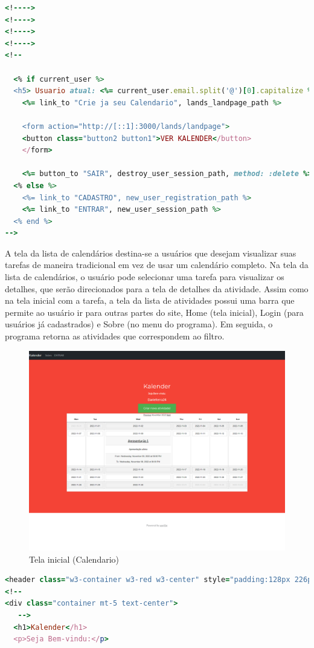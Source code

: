 \begin{itemize}
\begin{lstlisting}[language=Ruby, caption=Tela inicial do sistema (home)]
<!---->
<!---->
<!---->
<!---->
<!--

  <% if current_user %>
  <h5> Usuario atual: <%= current_user.email.split('@')[0].capitalize %> </h5>
    <%= link_to "Crie ja seu Calendario", lands_landpage_path %>

    <form action="http://[::1]:3000/lands/landpage">
    <button class="button2 button1">VER KALENDER</button>
    </form>

    <%= button_to "SAIR", destroy_user_session_path, method: :delete %>
  <% else %>
    <%= link_to "CADASTRO", new_user_registration_path %>
    <%= link_to "ENTRAR", new_user_session_path %>
  <% end %>
-->

        \end{lstlisting}

        A tela da lista de calendários destina-se a usuários que desejam visualizar suas tarefas de maneira tradicional em vez de usar um calendário completo. Na tela da lista de calendários, o usuário pode selecionar uma tarefa para visualizar os detalhes, que serão direcionados para a tela de detalhes da atividade. Assim como na tela inicial com a tarefa, a tela da lista de atividades possui uma barra que permite ao usuário ir para outras partes do site, Home (tela inicial), Login (para usuários já cadastrados) e Sobre (no menu do programa). Em seguida, o programa retorna as atividades que correspondem ao filtro.
        \begin{figure}[H]
          \begin{center}
            \includegraphics[width=12cm]{Pictures/interface/chat1.png}
            \caption{Tela inicial (Calendario)} \label{chat1}
          \end{center}
        \end{figure}
        \begin{lstlisting}[language=Ruby, caption=Ruby Controller]
          <header class="w3-container w3-red w3-center" style="padding:128px 226px">
<!--
<div class="container mt-5 text-center">
   -->
  <h1>Kalender</h1>
  <p>Seja Bem-vindu:</p>


\end{lstlisting}
\end{itemize}
